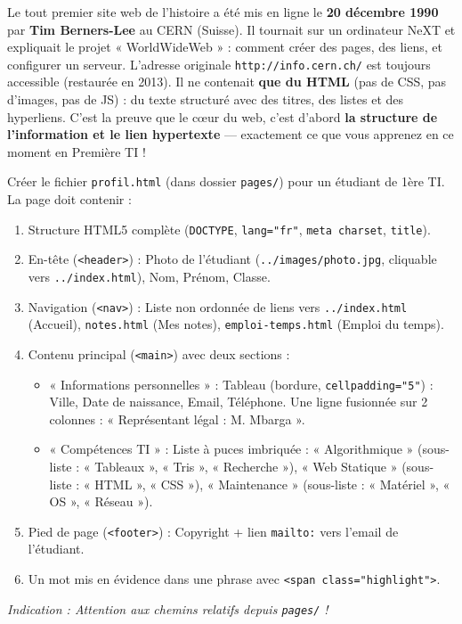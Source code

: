 \documentclass[11pt]{article}
\begin{document}
\begin{savaistu}
Le tout premier site web de l'histoire a été mis en ligne le \textbf{20 décembre 1990} par \textbf{Tim Berners-Lee} au CERN (Suisse). Il tournait sur un ordinateur NeXT et expliquait le projet « WorldWideWeb » : comment créer des pages, des liens, et configurer un serveur. L'adresse originale \texttt{http://info.cern.ch/} est toujours accessible (restaurée en 2013). Il ne contenait \textbf{que du HTML} (pas de CSS, pas d'images, pas de JS) : du texte structuré avec des titres, des listes et des hyperliens. C'est la preuve que le cœur du web, c'est d'abord \textbf{la structure de l'information et le lien hypertexte} — exactement ce que vous apprenez en ce moment en Première TI !
\end{savaistu}

\begin{exercice}
Créer le fichier \texttt{profil.html} (dans dossier \texttt{pages/}) pour un étudiant de 1ère TI. La page doit contenir :
\begin{enumerate}
  \item Structure HTML5 complète (\texttt{DOCTYPE}, \texttt{lang="fr"}, \texttt{meta charset}, \texttt{title}).
  \item En-tête (\texttt{<header>}) : Photo de l'étudiant (\texttt{../images/photo.jpg}, cliquable vers \texttt{../index.html}), Nom, Prénom, Classe.
  \item Navigation (\texttt{<nav>}) : Liste non ordonnée de liens vers \texttt{../index.html} (Accueil), \texttt{notes.html} (Mes notes), \texttt{emploi-temps.html} (Emploi du temps).
  \item Contenu principal (\texttt{<main>}) avec deux sections :
        \begin{itemize}
          \item « Informations personnelles » : Tableau (bordure, \texttt{cellpadding="5"}) : Ville, Date de naissance, Email, Téléphone. Une ligne fusionnée sur 2 colonnes : « Représentant légal : M. Mbarga ».
          \item « Compétences TI » : Liste à puces imbriquée : « Algorithmique » (sous-liste : « Tableaux », « Tris », « Recherche »), « Web Statique » (sous-liste : « HTML », « CSS »), « Maintenance » (sous-liste : « Matériel », « OS », « Réseau »).
        \end{itemize}
  \item Pied de page (\texttt{<footer>}) : Copyright + lien \texttt{mailto:} vers l'email de l'étudiant.
  \item Un mot mis en évidence dans une phrase avec \texttt{<span class="highlight">}.
\end{enumerate}
\textit{Indication : Attention aux chemins relatifs depuis \texttt{pages/} !}
\end{exercice}
\end{document}

